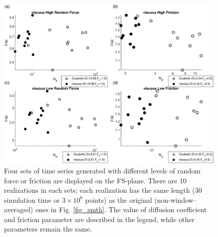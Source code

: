 \documentclass[%
 aip,
rsi,%
 amsmath,amssymb,
 reprint,%
]{revtex4-1}
\begin{document}
\begin{figure}
    \includegraphics[width=\textwidth]{NEW-2b.eps}
    \caption{\label{f_new}
        Four sets of time series generated with different levels of random force or friction are displayed on the FS-plane.
        There are 10 realizations in each sets; each realization has the same length (30 simulation time or $3\times 10^6$ points) as the original (non-window--averaged) ones in Fig. \ref{fig_smth}.
        The value of diffusion coefficient and friction parameter are described in the legend, while other parameters remain the same.
    }
\end{figure}
\end{document}
